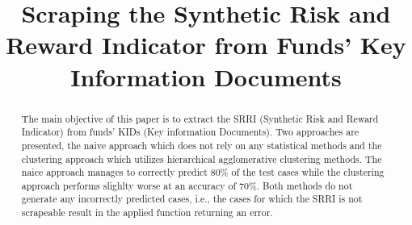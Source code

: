 \documentclass[aodsor,preprint]{imsart}
\numberwithin{equation}{section}
\theoremstyle{plain}
\begin{document}
\begin{frontmatter}
\title{Scraping the Synthetic Risk and Reward Indicator from Funds' Key Information Documents}

\begin{aug}
\author{ }





\end{aug}

\begin{abstract}
The main objective of this paper is to extract the SRRI (Synthetic Risk and Reward Indicator) from funds' KIDs (Key information Documents). Two approaches are presented, the naive approach which does not rely on any statistical methods and the clustering approach which utilizes hierarchical agglomerative clustering methods. The naice approach manages to correctly predict 80\% of the test cases while the clustering approach performs slighlty worse at an accuracy of 70\%. Both methods do not generate any incorrectly predicted cases, i.e., the cases for which the SRRI is not scrapeable result in the applied function returning an error.
\end{abstract}

\begin{keyword}[class=MSC]
\end{keyword}

\begin{keyword}
\kwd{\LaTeXe}
\end{keyword}

\end{frontmatter}
\end{document}
